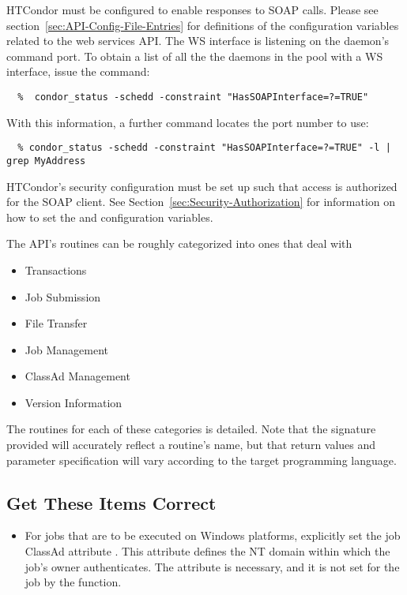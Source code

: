 HTCondor must be configured to enable responses to SOAP calls.
Please see 
section~\ref{sec:API-Config-File-Entries} for definitions of the
configuration variables related to the web services API.
The WS interface is listening on the  daemon's command port. 
To obtain a list of all the the  daemons in the
pool with a WS interface, issue the command:
\footnotesize
\begin{verbatim}
  %  condor_status -schedd -constraint "HasSOAPInterface=?=TRUE"
\end{verbatim}
\normalsize
With this information,
a further command locates the port number to use:
\footnotesize
\begin{verbatim}
  % condor_status -schedd -constraint "HasSOAPInterface=?=TRUE" -l | grep MyAddress 
\end{verbatim}
\normalsize

HTCondor's security configuration must be set up such that 
access is authorized for the SOAP client.
See Section~\ref{sec:Security-Authorization}
for information on how to set the
 and  configuration variables.


The API's routines can be roughly categorized into ones that
deal with
\begin{itemize}
  \item Transactions
  \item Job Submission
  \item File Transfer
  \item Job Management
  \item ClassAd Management
  \item Version Information
\end{itemize}
The routines for each of these categories is detailed.
Note that the signature provided will accurately 
reflect a routine's name, 
but that return values and parameter specification
will vary according  to the target programming language.

\subsection{\label{WebService-Gotchas} Get These Items Correct}

\begin{itemize}
\item For jobs that are to be executed on Windows platforms,
  explicitly set the job ClassAd attribute .
  This attribute defines the NT domain within which the
  job's owner authenticates.  The attribute is necessary,
  and it is not set for the job by the 
  function.

\end{itemize}


